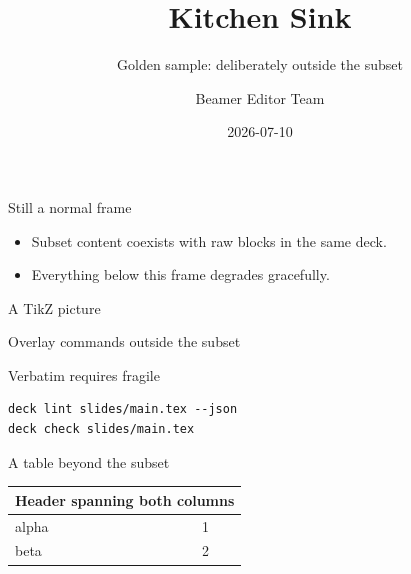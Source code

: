 \documentclass[aspectratio=169]{beamer}
\title{Kitchen Sink}
\subtitle{Golden sample: deliberately outside the subset}
\author{Beamer Editor Team}
\date{2026-07-10}
\begin{document}
\begin{frame}
  \titlepage
\end{frame}

\begin{frame}{Still a normal frame}
  \begin{itemize}
    \item Subset content coexists with raw blocks in the same deck.
    \item Everything below this frame degrades gracefully.
  \end{itemize}
\end{frame}

\begin{frame}{A TikZ picture}
  \begin{center}
  \end{center}
\end{frame}

\begin{frame}{Overlay commands outside the subset}
\end{frame}

\begin{frame}[fragile]{Verbatim requires fragile}
  \begin{verbatim}
deck lint slides/main.tex --json
deck check slides/main.tex
  \end{verbatim}
\end{frame}

\begin{frame}{A table beyond the subset}
  \begin{center}
    \begin{tabular}{|l|c|}
      \hline
      \multicolumn{2}{|c|}{Header spanning both columns} \\
      \hline
      alpha & 1 \\
      beta & 2 \\
      \hline
    \end{tabular}
  \end{center}
\end{frame}
\end{document}
